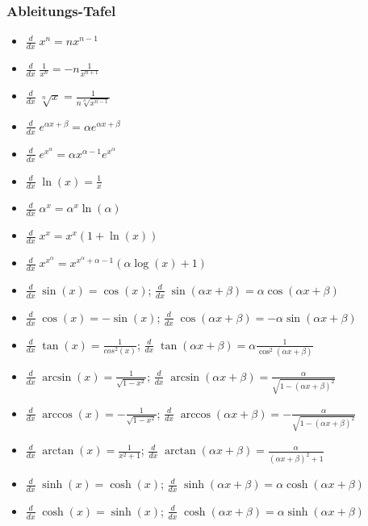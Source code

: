 \subsubsection{Ableitungs-Tafel}
\begin{itemize}[leftmargin=*]
	\item $\frac{d}{dx}\; x^n = nx^{n-1}$
	\item $\frac{d}{dx}\; \frac{1}{x^n} = -n \frac{1}{x^{n+1}}$
	\item $\frac{d}{dx}\; \sqrt[n]{x} = \frac{1}{n\sqrt[n]{x^{n-1}}}$
	\item $\frac{d}{dx}\; e^{\alpha x + \beta} = \alpha e^{\alpha x + \beta}$
	\item $\frac{d}{dx}\; e^{x^\alpha} = \alpha x^{\alpha - 1} e^{x^\alpha}$
	\item $\frac{d}{dx}\; \ln(x) = \frac{1}{x}$
	\item $\frac{d}{dx}\; \alpha^x = \alpha^x \ln(\alpha)$
	\item $\frac{d}{dx}\; x^x = x^x (1 + \ln(x))$
	\item $\frac{d}{dx}\; x^{x^\alpha} = x^{x^\alpha + \alpha - 1} (\alpha
	\log(x) + 1)$
	\newline
	\item $\frac{d}{dx}\; \sin(x) = \cos(x)$;
	$\frac{d}{dx}\; \sin(\alpha x + \beta) = \alpha \cos(\alpha x +
	\beta)$
	\item $\frac{d}{dx}\; \cos(x) = -\sin(x)$;
	$\frac{d}{dx}\; \cos(\alpha x + \beta) = -\alpha \sin(\alpha x + \beta)$
	\item $\frac{d}{dx}\; \tan(x) = \frac{1}{cos^2(x)}$;
	$\frac{d}{dx}\; \tan(\alpha x + \beta) = \alpha \frac{1}{\cos^2(\alpha x
	+ \beta)}$
	\item $\frac{d}{dx}\; \arcsin(x) = \frac{1}{\sqrt{1-x^2}}$;  
		$\frac{d}{dx}\; \arcsin(\alpha x + \beta) =
	\frac{\alpha}{\sqrt{1-(\alpha x + \beta)^2}}$
	\item $\frac{d}{dx}\; \arccos(x) = -\frac{1}{\sqrt{1-x^2}}$;
		$\frac{d}{dx}\; \arccos(\alpha x + \beta) = -\frac{\alpha}{\sqrt{1 -
	(\alpha x + \beta)^2}}$
	\item $\frac{d}{dx}\; \arctan(x) = \frac{1}{x^2+1}$; 
		$\frac{d}{dx}\; \arctan(\alpha x + \beta) = \frac{\alpha}{(\alpha x +
	\beta)^2 + 1}$
	\newline
	\item $\frac{d}{dx}\; \sinh(x) = \cosh(x)$;
	$\frac{d}{dx}\; \sinh(\alpha x + \beta) = \alpha \cosh(\alpha x + \beta)$
	\item $\frac{d}{dx}\; \cosh(x) = \sinh(x)$;
	$\frac{d}{dx}\; \cosh(\alpha x + \beta) = \alpha \sinh(\alpha x + \beta)$

\end{itemize}
